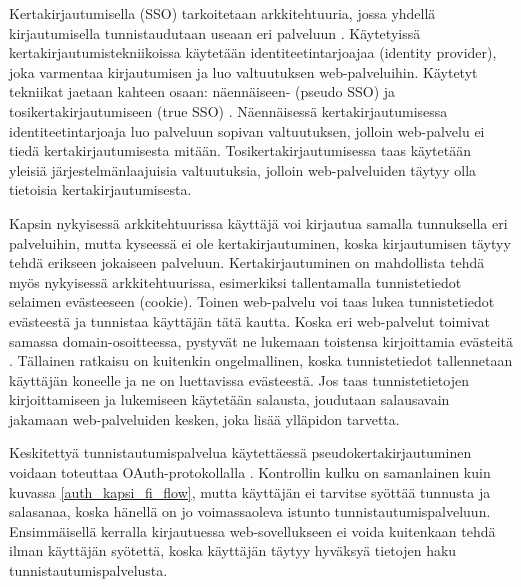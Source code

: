 Kertakirjautumisella (SSO) tarkoitetaan arkkitehtuuria, jossa yhdellä kirjautumisella tunnistaudutaan useaan eri palveluun \cite{sso}. Käytetyissä kertakirjautumistekniikoissa käytetään identiteetintarjoajaa (identity provider), joka varmentaa kirjautumisen ja luo valtuutuksen web-palveluihin. Käytetyt tekniikat jaetaan kahteen osaan: näennäiseen- (pseudo SSO) ja tosikertakirjautumiseen (true SSO) \cite{sso}. Näennäisessä kertakirjautumisessa identiteetintarjoaja luo palveluun sopivan valtuutuksen, jolloin web-palvelu ei tiedä kertakirjautumisesta mitään. Tosikertakirjautumisessa taas käytetään yleisiä järjestelmänlaajuisia valtuutuksia, jolloin web-palveluiden täytyy olla tietoisia kertakirjautumisesta.

Kapsin nykyisessä arkkitehtuurissa käyttäjä voi kirjautua samalla tunnuksella eri palveluihin, mutta kyseessä ei ole kertakirjautuminen, koska kirjautumisen täytyy tehdä erikseen jokaiseen palveluun. Kertakirjautuminen on mahdollista tehdä myös nykyisessä arkkitehtuurissa, esimerkiksi tallentamalla tunnistetiedot selaimen evästeeseen (cookie). Toinen web-palvelu voi taas lukea tunnistetiedot evästeestä ja tunnistaa käyttäjän tätä kautta. Koska eri web-palvelut toimivat samassa domain-osoitteessa, pystyvät ne lukemaan toistensa kirjoittamia evästeitä \cite{rfc6265}. Tällainen ratkaisu on kuitenkin ongelmallinen, koska tunnistetiedot tallennetaan käyttäjän koneelle ja ne on luettavissa evästeestä. Jos taas tunnistetietojen kirjoittamiseen ja lukemiseen käytetään salausta, joudutaan salausavain jakamaan web-palveluiden kesken, joka lisää ylläpidon tarvetta.

Keskitettyä tunnistautumispalvelua käytettäessä pseudokertakirjautuminen voidaan toteuttaa OAuth-protokollalla \cite{distributed_web_security}. Kontrollin kulku on samanlainen kuin kuvassa \ref{auth_kapsi_fi_flow}, mutta käyttäjän ei tarvitse syöttää tunnusta ja salasanaa, koska hänellä on jo voimassaoleva istunto tunnistautumispalveluun. Ensimmäisellä kerralla kirjautuessa web-sovellukseen ei voida kuitenkaan tehdä ilman käyttäjän syötettä, koska käyttäjän täytyy hyväksyä tietojen haku tunnistautumispalvelusta.